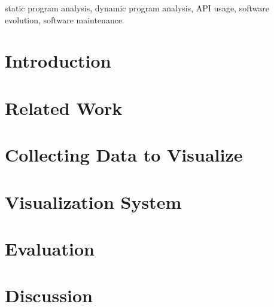 \documentclass[conference]{IEEEtran}
\begin{document}
\begin{IEEEkeywords}
static program analysis,
dynamic program analysis,
API usage,
software evolution,
software maintenance
\end{IEEEkeywords}

\section{Introduction}


\section{Related Work}


\section{Collecting Data to Visualize}


\section{Visualization System}


\section{Evaluation}


\section{Discussion}




\end{document}
